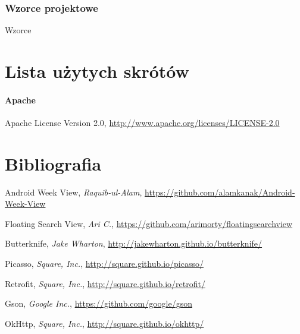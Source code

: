 \documentclass[10pt,a4paper]{article}
\begin{document}
\subsubsection{Wzorce projektowe}
Wzorce

\newpage
\section{Lista użytych skrótów}
\label{abbr:lic}
\paragraph{Apache} Apache License Version 2.0, \url{http://www.apache.org/licenses/LICENSE-2.0} 

\renewcommand*{\refname}{\vspace*{-2em}}
\section{Bibliografia}
\begin{thebibliography}{99}

		Android Week View,
		\emph{Raquib-ul-Alam},
		\url{https://github.com/alamkanak/Android-Week-View}
		
		Floating Search View,
		\emph{Ari C.},
		\url{https://github.com/arimorty/floatingsearchview}
		
		Butterknife,
		\emph{Jake Wharton},
		\url{http://jakewharton.github.io/butterknife/}
		
		Picasso,
		\emph{Square, Inc.},
		\url{http://square.github.io/picasso/}
		
		Retrofit,
		\emph{Square, Inc.},
		\url{http://square.github.io/retrofit/}
		
		Gson,
		\emph{Google Inc.},
		\url{https://github.com/google/gson}
		
		OkHttp,
		\emph{Square, Inc.},
		\url{http://square.github.io/okhttp/}\\
		
\end{thebibliography}
\end{document}
